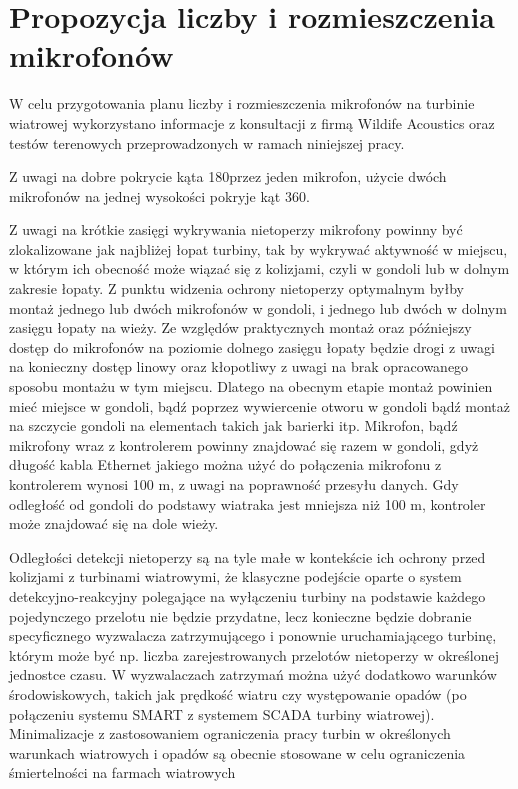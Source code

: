 \documentclass{sprz}
\begin{document}
\section{Propozycja liczby i rozmieszczenia mikrofonów}
W celu przygotowania planu liczby i rozmieszczenia mikrofonów na turbinie wiatrowej wykorzystano informacje z konsultacji z firmą Wildife Acoustics oraz testów terenowych przeprowadzonych w ramach niniejszej pracy.

Z uwagi na dobre pokrycie kąta 180\textdegree przez jeden mikrofon, użycie dwóch mikrofonów na jednej wysokości pokryje kąt 360\textdegree.

Z uwagi na krótkie zasięgi wykrywania nietoperzy mikrofony powinny być zlokalizowane jak najbliżej łopat turbiny, tak by wykrywać aktywność w miejscu, w którym ich obecność może wiązać się z kolizjami, czyli w gondoli lub w dolnym zakresie łopaty. Z punktu widzenia ochrony nietoperzy optymalnym byłby montaż jednego lub dwóch mikrofonów w gondoli, i jednego lub dwóch w dolnym zasięgu łopaty na wieży. Ze względów praktycznych montaż oraz późniejszy dostęp do mikrofonów na poziomie dolnego zasięgu łopaty będzie drogi z uwagi na konieczny dostęp linowy oraz kłopotliwy z uwagi na brak opracowanego sposobu montażu w tym miejscu. Dlatego na obecnym etapie montaż powinien mieć miejsce w gondoli, bądź poprzez wywiercenie otworu w gondoli bądź montaż na szczycie gondoli na elementach takich jak barierki itp.
Mikrofon, bądź mikrofony wraz z kontrolerem powinny znajdować się razem w gondoli, gdyż długość kabla Ethernet jakiego można użyć do połączenia mikrofonu z kontrolerem wynosi 100 m, z uwagi na poprawność przesyłu danych. Gdy odległość od gondoli do podstawy wiatraka jest mniejsza niż 100 m, kontroler może znajdować się na dole wieży.

Odległości detekcji nietoperzy są na tyle małe w kontekście ich ochrony przed kolizjami z turbinami wiatrowymi, że klasyczne podejście oparte o system detekcyjno-reakcyjny polegające na wyłączeniu turbiny na podstawie każdego pojedynczego przelotu nie będzie przydatne, lecz konieczne będzie dobranie specyficznego wyzwalacza zatrzymującego i ponownie uruchamiającego turbinę, którym może być np. liczba zarejestrowanych przelotów nietoperzy w określonej jednostce czasu. W wyzwalaczach zatrzymań można użyć dodatkowo warunków środowiskowych, takich jak prędkość wiatru czy występowanie opadów (po połączeniu systemu SMART z systemem SCADA turbiny wiatrowej). Minimalizacje z zastosowaniem ograniczenia pracy turbin w określonych warunkach wiatrowych i opadów są obecnie stosowane w celu ograniczenia śmiertelności na farmach wiatrowych \cite{Wytyczne}
\end{document}
